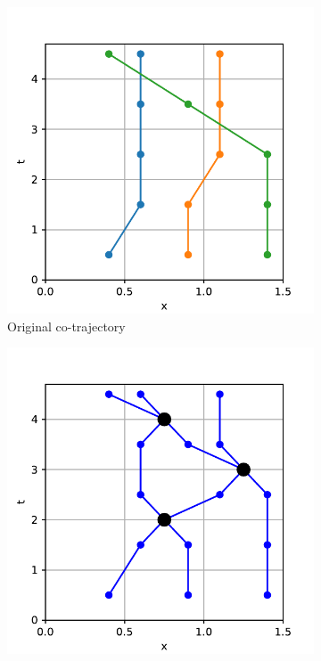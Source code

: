 \documentclass[12pt]{article}
\theoremstyle{definition}
\begin{document}
\begin{figure}
    \centering
    \begin{subfigure}[t]{0.45\textwidth}
      \includegraphics[width=\textwidth]{graph-swap-full-a.pdf}
      \caption{Original co-trajectory}
      \label{fig:graph-swap-full-a}
    \end{subfigure}
    \begin{subfigure}[t]{0.45\textwidth}
      \includegraphics[width=\textwidth]{graph-swap-full-b.pdf}

\end{subfigure}
\end{figure}
\end{document}
